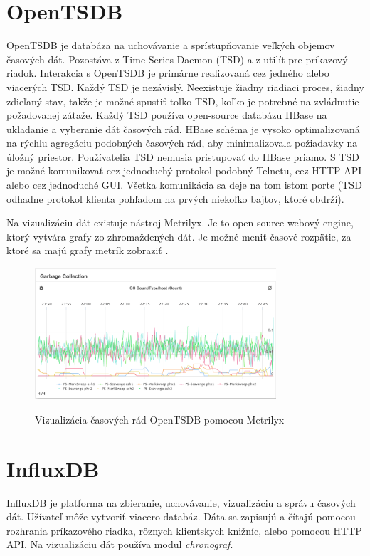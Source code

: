 \documentclass[11pt,final,oneside]{fithesis}
\begin{document}
\section{OpenTSDB}
OpenTSDB je databáza na uchovávanie a sprístupňovanie veľkých objemov časových dát. Pozostáva z Time Series Daemon (TSD) a z utilít pre príkazový riadok. Interakcia s OpenTSDB je primárne realizovaná cez jedného alebo viacerých TSD. Každý TSD je nezávislý.
Neexistuje žiadny riadiaci proces, žiadny zdieľaný stav, takže je možné spustiť toľko TSD, koľko je potrebné na zvládnutie požadovanej záťaže. Každý TSD používa open-source databázu HBase
na ukladanie a vyberanie dát časových rád. HBase schéma je vysoko optimalizovaná na rýchlu agregáciu podobných časových rád, aby minimalizovala požiadavky na úložný priestor. 
Používatelia TSD nemusia pristupovať do HBase priamo. S TSD je možné komunikovať cez jednoduchý protokol podobný Telnetu, cez HTTP API alebo cez jednoduché GUI. Všetka komunikácia
sa deje na tom istom porte (TSD odhadne protokol klienta pohľadom na prvých niekoľko bajtov, ktoré obdrží).\cite{openTSDB}

Na vizualizáciu dát existuje nástroj Metrilyx. Je to open-source webový engine, ktorý vytvára grafy zo zhromaždených dát. Je možné meniť časové rozpätie, za ktoré sa majú grafy metrík zobraziť .
\begin{figure}[h]
\begin{center}
       \includegraphics[width=0.8\textwidth]{images/metrilyx.png}
       \caption{Vizualizácia časových rád OpenTSDB pomocou Metrilyx}\cite{Metrilyx}
\end{center}
\end{figure}

\section{InfluxDB}
InfluxDB je platforma na zbieranie, uchovávanie, vizualizáciu a správu časových dát. Užívateľ môže vytvoriť viacero databáz. Dáta sa zapisujú a čítajú pomocou rozhrania príkazového riadka, 
rôznych klientskych knižníc, alebo pomocou HTTP API. Na vizualizáciu dát používa modul \emph{chronograf}.
\end{document}
